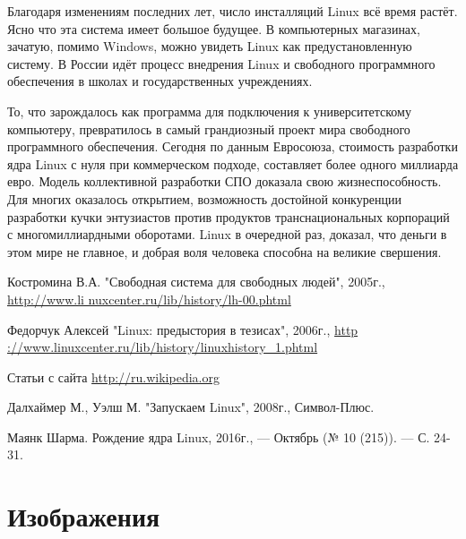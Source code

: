 \documentclass[bachelor, och, referat, times]{SCWorks}
\begin{document}
\par Благодаря изменениям последних лет, число инсталляций Linux всё время
растёт. Ясно что эта система имеет большое будущее. В компьютерных 
магазинах, зачатую, помимо Windows, можно увидеть Linux как 
предустановленную систему. В России идёт процесс внедрения Linux и 
свободного программного обеспечения в школах и государственных 
учреждениях.

\conclusion

То, что зарождалось как программа для подключения к университетскому 
компьютеру, превратилось в самый грандиозный проект мира свободного 
программного обеспечения. Сегодня по данным Евросоюза, стоимость 
разработки ядра Linux с нуля при коммерческом подходе, составляет более 
одного миллиарда евро. Модель коллективной разработки СПО доказала свою 
жизнеспособность. Для многих оказалось открытием, возможность достойной 
конкуренции разработки кучки энтузиастов против продуктов 
транснациональных корпораций с многомиллиардными оборотами. Linux в 
очередной раз, доказал, что деньги в этом мире не главное, и добрая воля 
человека способна на великие свершения.

\begin{thebibliography}{99}
	 Костромина В.А. "Свободная система для свободных 
	людей", 2005г.,
	\href{http://www.linuxcenter.ru/lib/history/lh-00.phtml}{http://www.li
	nuxcenter.ru/lib/history/lh-00.phtml}
	
	 Федорчук Алексей "Linux: предыстория в тезисах", 
	2006г.,
	\href{http://www.linuxcenter.ru/lib/history/linuxhistory_1.phtml}{http
	://www.linuxcenter.ru/lib/history/linuxhistory\_1.phtml}
	
	 Статьи с сайта
	\href{http://ru.wikipedia.org}{http://ru.wikipedia.org}
	
	 Далхаймер М., Уэлш М. "Запускаем Linux", 2008г., 
	Символ-Плюс.
	
	 Маянк Шарма. Рождение ядра Linux, 2016г., — Октябрь (№
	10 (215)). — С. 24-31.
\end{thebibliography}

\appendix

\section{Изображения}
\end{document}
